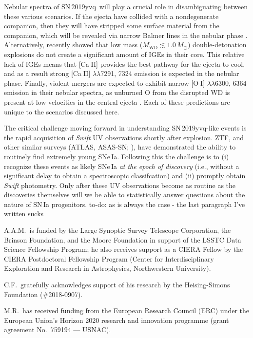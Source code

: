 \documentclass[twocolumn]{aastex63}
\def\ion#1#2{#1$\;${\footnotesize\rm{#2}}\relax}
\newcommand{\todo}[1]{{\color{magenta} to-do: {#1}}}
\newcommand{\sn}{SN\,2019yvq}
\begin{document}
Nebular spectra of \sn\ will play a crucial role in disambiguating between
these various scenarios. If the ejecta have collided with a nondegenerate
companion, then they will have stripped some surface material from the
companion, which will be revealed via narrow Balmer lines in the nebular phase
\citep[e.g.,][]{Wheeler75}. Alternatively, \citet{Polin19a} recently showed
that low mass ($M_\mathrm{WD} \lesssim 1.0\,M_\odot$) double-detonation
explosions do not create a significant amount of IGEs in their core. This
relative lack of IGEs means that [\ion{Ca}{II}] provides the best pathway for
the ejecta to cool, and as a result strong [\ion{Ca}{II}]
$\lambda\lambda$7291, 7324 emission is expected in the nebular phase. Finally,
violent mergers are expected to exhibit narrow [\ion{O}{I}]
$\lambda\lambda$6300, 6364 emission in their nebular spectra, as unburned O
from the disrupted WD is present at low velocities in the central ejecta
\citep{Taubenberger13,Kromer16}. Each of these predictions are unique to the
scenarios discussed here.

The critical challenge moving forward in understanding \sn-like events is the
rapid acquisition of \textit{Swift} UV observations shortly after explosion.
ZTF, and other similar surveys (ATLAS, ASAS-SN; \citealt{Tonry11,Holoien17}),
have demonstrated the ability to routinely find extremely young SNe\,Ia.
Following this the challenge is to (i) recognize these events as likely
SNe\,Ia \textit{at the epoch of discovery} (i.e., without a significant delay
to obtain a spectroscopic classifcation) and (ii) promptly obtain
\textit{Swift} photometry. Only after these UV observations become as routine
as the discoveries themselves will we be able to statistically answer
questions about the nature of SN\,Ia progenitors. \todo{as is always the case
- the last paragraph I've written sucks}


\acknowledgements

A.A.M.~is funded by the Large Synoptic Survey Telescope Corporation, the
Brinson Foundation, and the Moore Foundation in support of the LSSTC Data
Science Fellowship Program; he also receives support as a CIERA Fellow by the
CIERA Postdoctoral Fellowship Program (Center for Interdisciplinary
Exploration and Research in Astrophysics, Northwestern University).

C.F.~gratefully acknowledges support of his research by the Heising-Simons
Foundation (\#2018-0907).

M.R.~has received funding from the European Research Council (ERC) under the
European Union’s Horizon 2020 research and innovation programme (grant
agreement No.\ 759194 — USNAC).
\end{document}
